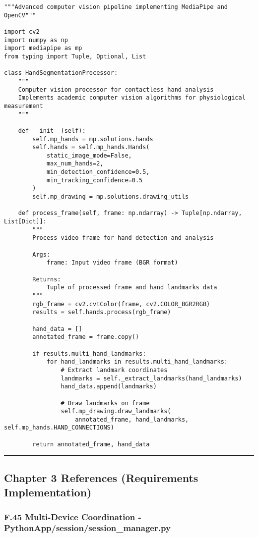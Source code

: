 \documentclass[12pt,a4paper]{article}
\begin{document}
\begin{verbatim}
"""Advanced computer vision pipeline implementing MediaPipe and OpenCV"""

import cv2
import numpy as np
import mediapipe as mp
from typing import Tuple, Optional, List

class HandSegmentationProcessor:
    """
    Computer vision processor for contactless hand analysis
    Implements academic computer vision algorithms for physiological measurement
    """
    
    def __init__(self):
        self.mp_hands = mp.solutions.hands
        self.hands = self.mp_hands.Hands(
            static_image_mode=False,
            max_num_hands=2,
            min_detection_confidence=0.5,
            min_tracking_confidence=0.5
        )
        self.mp_drawing = mp.solutions.drawing_utils
        
    def process_frame(self, frame: np.ndarray) -> Tuple[np.ndarray, List[Dict]]:
        """
        Process video frame for hand detection and analysis
        
        Args:
            frame: Input video frame (BGR format)
            
        Returns:
            Tuple of processed frame and hand landmarks data
        """
        rgb_frame = cv2.cvtColor(frame, cv2.COLOR_BGR2RGB)
        results = self.hands.process(rgb_frame)
        
        hand_data = []
        annotated_frame = frame.copy()
        
        if results.multi_hand_landmarks:
            for hand_landmarks in results.multi_hand_landmarks:
                # Extract landmark coordinates
                landmarks = self._extract_landmarks(hand_landmarks)
                hand_data.append(landmarks)
                
                # Draw landmarks on frame
                self.mp_drawing.draw_landmarks(
                    annotated_frame, hand_landmarks, self.mp_hands.HAND_CONNECTIONS)
        
        return annotated_frame, hand_data
\end{verbatim}

\hrule

\subsection{Chapter 3 References (Requirements Implementation)}

\subsubsection{F.45 Multi-Device Coordination - PythonApp/session/session_manager.py}
\end{document}
